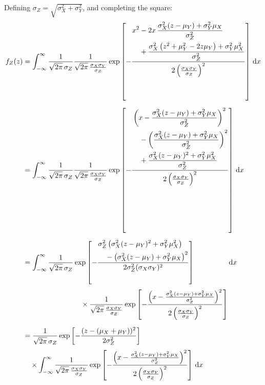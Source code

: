 \documentclass{MFM-hw} %
\newcommand{\dd}{\,\mathrm{d}}
\begin{document}
Defining $\sigma_Z = \sqrt{\sigma_X^2 + \sigma_Y^2}$, and completing the square:
\begin{align*}
f_Z(z)
&= \int_{-\infty}^{\infty}
   \frac{1}{\sqrt{2\pi}\,\sigma_Z}
   \frac{1}{\sqrt{2\pi}\,\frac{\sigma_X \sigma_Y}{\sigma_Z}}
   \exp \left[ -\frac{
      \begin{aligned}
        &x^2 - 2x\,\frac{\sigma_X^2 (z - \mu_Y) + \sigma_Y^2 \mu_X}{\sigma_Z^2} \\
        &\quad {}+ \frac{\sigma_X^2 \left(z^2 + \mu_Y^2 - 2z\mu_Y\right) + \sigma_Y^2 \mu_X^2}{\sigma_Z^2}
      \end{aligned}
   }{2\left(\frac{\sigma_X \sigma_Y}{\sigma_Z}\right)^{2}} \right]
   \dd x \\[6pt]
&= \int_{-\infty}^{\infty}
   \frac{1}{\sqrt{2\pi}\,\sigma_Z}
   \frac{1}{\sqrt{2\pi}\,\frac{\sigma_X \sigma_Y}{\sigma_Z}}
   \exp \left[ -\frac{
      \begin{aligned}
        &\left(x - \frac{\sigma_X^2 (z - \mu_Y) + \sigma_Y^2 \mu_X}{\sigma_Z^2}\right)^{2} \\
        &\quad {} - \left(\frac{\sigma_X^2 (z - \mu_Y) + \sigma_Y^2 \mu_X}{\sigma_Z^2}\right)^{2} \\
        &\quad {} + \frac{\sigma_X^2 (z - \mu_Y)^2 + \sigma_Y^2 \mu_X^2}{\sigma_Z^2}
      \end{aligned}
   }{2\left(\frac{\sigma_X \sigma_Y}{\sigma_Z}\right)^{2}} \right]
   \dd x \\[6pt]
&= \int_{-\infty}^{\infty}
   \frac{1}{\sqrt{2\pi}\,\sigma_Z}
   \begin{aligned}[t]
     &\exp \left[ -\frac{
        \begin{aligned}
          &\sigma_Z^2 \left(\sigma_X^2 (z - \mu_Y)^2 + \sigma_Y^2 \mu_X^2\right) \\
          &\quad {} - \left(\sigma_X^2 (z - \mu_Y) + \sigma_Y^2 \mu_X\right)^{2}
        \end{aligned}
     }{2\sigma_Z^2 (\sigma_X \sigma_Y)^{2}} \right] \\[3pt]
     &\quad \times \frac{1}{\sqrt{2\pi}\,\frac{\sigma_X \sigma_Y}{\sigma_Z}}
       \exp \left[ -\frac{
          \left(x - \frac{\sigma_X^2 (z - \mu_Y) + \sigma_Y^2 \mu_X}{\sigma_Z^2}\right)^{2}
       }{2\left(\frac{\sigma_X \sigma_Y}{\sigma_Z}\right)^{2}} \right]
   \end{aligned}
   \dd x \\[6pt]
&= \frac{1}{\sqrt{2\pi}\,\sigma_Z}
   \exp \left[ -\frac{(z - (\mu_X + \mu_Y))^2}{2\sigma_Z^2} \right] \notag \\[3pt]
&\quad \times \int_{-\infty}^{\infty}
   \frac{1}{\sqrt{2\pi}\,\frac{\sigma_X \sigma_Y}{\sigma_Z}}
   \exp \left[ -\frac{
      \left(x - \frac{\sigma_X^2 (z - \mu_Y) + \sigma_Y^2 \mu_X}{\sigma_Z^2}\right)^{2}
   }{2\left(\frac{\sigma_X \sigma_Y}{\sigma_Z}\right)^{2}} \right]
   \dd x
\end{align*}
\end{document}
